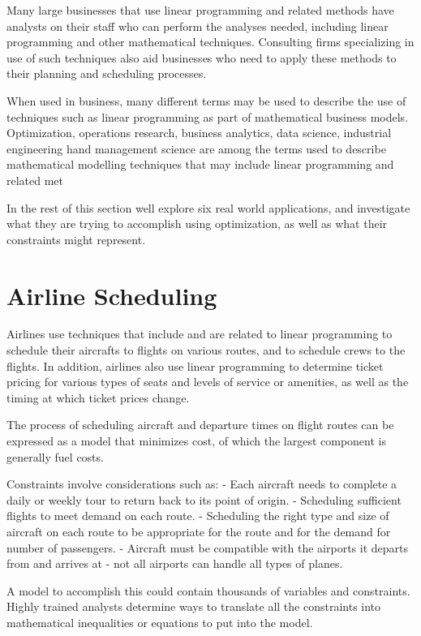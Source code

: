 Many large businesses that use linear programming and related methods have analysts on their staff who can perform the analyses needed, including linear programming and other mathematical techniques. Consulting firms specializing in use of such techniques also aid businesses who need to apply these methods to their planning and scheduling processes.

When used in business, many different terms may be used to describe the use of techniques such as linear programming as part of mathematical business models. Optimization, operations research, business analytics, data science, industrial engineering hand management science are among the terms used to describe mathematical modelling techniques that may include linear programming and related met

In the rest of this section well explore six real world applications, and investigate what they are trying to accomplish using optimization, as well as what their constraints might represent.

\section*{Airline Scheduling}

Airlines use techniques that include and are related to linear programming to schedule their aircrafts to flights on various routes, and to schedule crews to the flights. In addition, airlines also use linear programming to determine ticket pricing for various types of seats and levels of service or amenities, as well as the timing at which ticket prices change.

The process of scheduling aircraft and departure times on flight routes can be expressed as a model that minimizes cost, of which the largest component is generally fuel costs.

Constraints involve considerations such as:
- Each aircraft needs to complete a daily or weekly tour to return back to its point of origin.
- Scheduling sufficient flights to meet demand on each route.
- Scheduling the right type and size of aircraft on each route to be appropriate for the route and for the demand for number of passengers.
- Aircraft must be compatible with the airports it departs from and arrives at - not all airports can handle all types of planes.

A model to accomplish this could contain thousands of variables and constraints. Highly trained analysts determine ways to translate all the constraints into mathematical inequalities or equations to put into the model.

